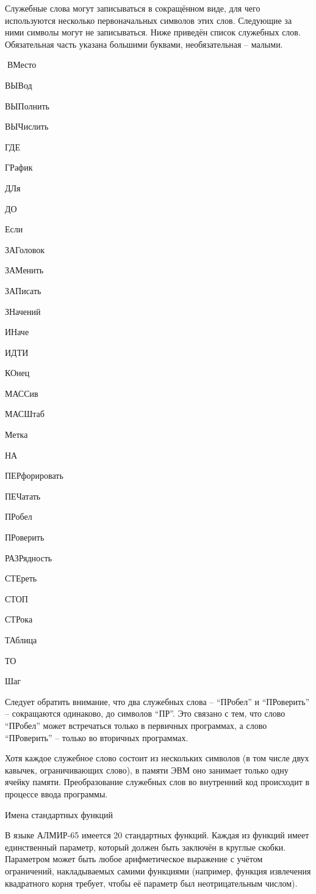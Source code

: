 \documentclass[11pt]{article}
\begin{document}
Служебные слова могут записываться в
сокращённом виде, для чего
используются несколько первоначальных
символов этих слов. Следующие за ними
символы могут не записываться. Ниже
приведён список служебных слов.
Обязательная часть указана большими
буквами, необязательная – малыми.

ВМесто

ВЫВод

ВЫПолнить

ВЫЧислить

ГДЕ

ГРафик

ДЛя

ДО

Если

ЗАГоловок

ЗАМенить

ЗАПисать

ЗНачений

ИНаче

ИДТИ

КОнец

МАССив

МАСШтаб

Метка

НА

ПЕРфорировать

ПЕЧатать

ПРобел

ПРоверить

РАЗРядность

СТЕреть

СТОП

СТРока

ТАблица

ТО

Шаг

Следует обратить внимание, что два
служебных слова – “ПРобел” и
“ПРоверить” – сокращаются одинаково,
до символов “ПР”. Это связано с тем,
что слово “ПРобел” может встречаться
только в первичных программах, а слово
“ПРоверить” – только во вторичных
программах.

Хотя каждое служебное слово состоит из
нескольких символов (в том числе двух
кавычек, ограничивающих слово), в
памяти ЭВМ оно занимает только одну
ячейку памяти. Преобразование
служебных слов во внутренний код
происходит в процессе ввода программы.

Имена стандартных функций

В языке АЛМИР-65 имеется 20 стандартных
функций. Каждая из функций имеет
единственный параметр, который должен
быть заключён в круглые скобки.
Параметром может быть любое
арифметическое выражение с учётом
ограничений, накладываемых самими
функциями (например, функция
извлечения квадратного корня требует,
чтобы её параметр был неотрицательным
числом).
\end{document}
